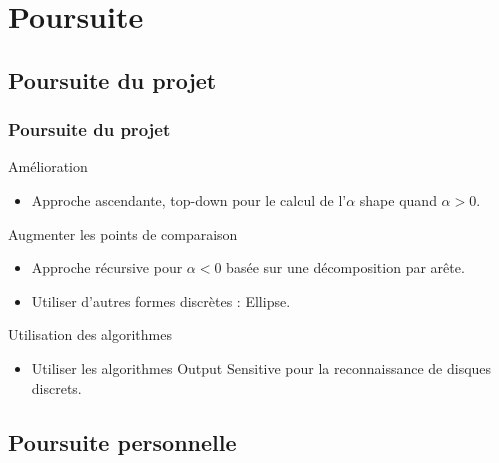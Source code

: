 \section{Poursuite}

\subsection{Poursuite du projet}

\begin{frame}
\frametitle{Poursuite du projet}

  \begin{block}{Amélioration}
    \begin{itemize}
      \item Approche ascendante, top-down pour le calcul de l'$\alpha$ shape quand $\alpha > 0$.
    \end{itemize}
  \end{block}
  \begin{block}{Augmenter les points de comparaison}
    \begin{itemize}
      \item Approche récursive pour $\alpha <0$ basée sur une décomposition par arête.
      \item Utiliser d'autres formes discrètes : Ellipse.
    \end{itemize}
  \end{block}
  \begin{block}{Utilisation des algorithmes}
    \begin{itemize}
      \item Utiliser les algorithmes Output Sensitive pour la reconnaissance de disques discrets.
    \end{itemize}
  \end{block}


\end{frame}

\subsection{Poursuite personnelle}

